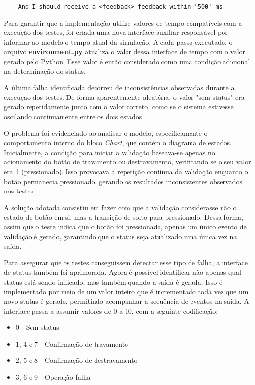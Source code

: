 \begin{verbatim}
	And I should receive a <feedback> feedback within '500' ms
\end{verbatim}


Para garantir que a implementação utilize valores de tempo compatíveis com a execução dos testes, foi criada uma nova interface auxiliar responsável por informar ao 
modelo o tempo atual da simulação. A cada passo executado, o arquivo \textbf{environment.py} atualiza o valor dessa interface de tempo com o valor gerado pelo Python. 
Esse valor é então considerado como uma condição adicional na determinação do status.

A última falha identificada decorreu de inconsistências observadas durante a execução dos testes. De forma aparentemente aleatória, o valor "sem status" era gerado 
repetidamente junto com o valor correto, como se o sistema estivesse oscilando continuamente entre os dois estados.

O problema foi evidenciado ao analisar o modelo, especificamente o comportamento interno do bloco \textit{Chart}, que contém o diagrama de estados. Inicialmente, a 
condição para iniciar a validação baseava-se apenas no acionamento do botão de travamento ou destravamento, verificando se o seu valor era 1 (pressionado). Isso 
provocava a repetição contínua da validação enquanto o botão permanecia pressionado, gerando os resultados inconsistentes observados nos testes.

A solução adotada consistiu em fazer com que a validação considerasse não o estado do botão em si, mas a transição de solto para pressionado. Dessa forma, assim que o 
teste indica que o botão foi pressionado, apenas um único evento de validação é gerado, garantindo que o status seja atualizado uma única vez na saída.

Para assegurar que os testes conseguissem detectar esse tipo de falha, a interface de status também foi aprimorada. Agora é possível identificar não apenas qual status 
está sendo indicado, mas também quando a saída é gerada. Isso é implementado por meio de um valor inteiro que é incrementado toda vez que um novo status é gerado, 
permitindo acompanhar a sequência de eventos na saída. A interface passa a assumir valores de 0 a 10, com a seguinte codificação:

\begin{itemize}
	\item 0 - Sem status
	\item 1, 4 e 7 - Confirmação de travamento
	\item 2, 5 e 8 - Confirmação de destravamento
	\item 3, 6 e 9 - Operação falha
\end{itemize}

